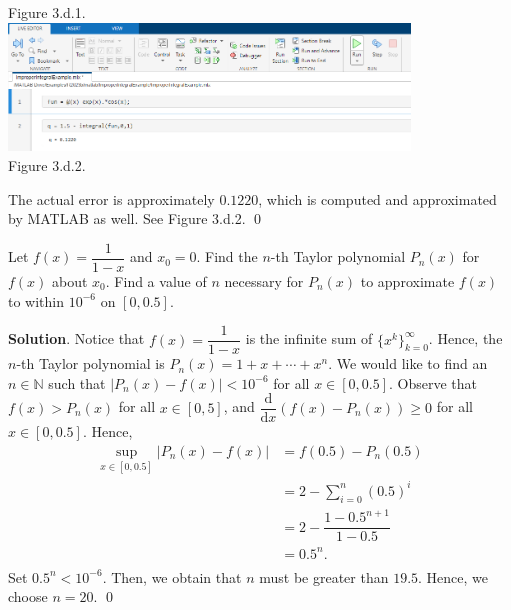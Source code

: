 \documentclass[11pt]{article}
\theoremstyle{break}
\newcommand{\dd}{\text{d}}
\numberwithin{equation}{theorem}
\begin{document}
\begin{enumerate}
\begin{center}
        Figure 3.d.1.\\\vspace{1.9em}
        \includegraphics[width=0.8\textwidth]{P3d2.png}\\
        Figure 3.d.2.
    \end{center}
    The actual error is approximately $0.1220$, which is computed and approximated by MATLAB as well. See Figure 3.d.2. \qed
\end{enumerate}

\newpage
\begin{problem}\label{problem 4}
    Let $f(x)=\dfrac{1}{1-x}$ and $x_0=0$. Find the $n$-th Taylor polynomial $P_n(x)$ for $f(x)$ about $x_0$. Find a value of $n$ necessary for $P_n(x)$ to approximate $f(x)$ to within $10^{-6}$ on $[0, 0.5]$.
\end{problem}
\textbf{Solution}. Notice that $f(x)=\dfrac{1}{1-x}$ is the infinite sum of $\{x^k\}_{k=0}^\infty$. Hence, the $n$-th Taylor polynomial is $\displaystyle P_n(x)=1+x+\cdots+x^n$. We would like to find an $n\in\mathbb{N}$ such that $|P_n(x)-f(x)|<10^{-6}$ for all $x\in[0, 0.5]$. Observe that $f(x)>P_n(x)$ for all $x\in[0, 5]$, and $\dfrac{\dd}{\dd x}\left(f(x)-P_n(x)\right)\geq 0$ for all $x\in[0, 0.5]$. Hence, \vspace{-0.6em}
\begin{align*}
    \sup_{x\in[0, 0.5]}|P_n(x)-f(x)|&=f(0.5)-P_n(0.5)\\
    &=2-\sum_{i=0}^{n}(0.5)^i\\
    &=2-\dfrac{1-0.5^{n+1}}{1-0.5}\\
    &=0.5^n.\\[-3.4em]
\end{align*}
Set $0.5^n<10^{-6}$. Then, we obtain that $n$ must be greater than $19.5$. Hence, we choose $n=20$. \qed
\end{document}
